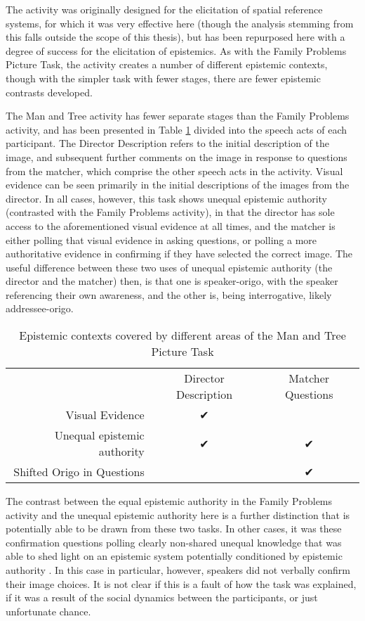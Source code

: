The activity was originally designed for the elicitation of spatial reference systems, for which it was very effective here (though the analysis stemming from this falls outside the scope of this thesis), but has been repurposed here with a degree of success for the elicitation of epistemics. As with the Family Problems Picture Task, the activity creates a number of different epistemic contexts, though with the simpler task with fewer stages, there are fewer epistemic contrasts developed. 

The Man and Tree activity has fewer separate stages than the Family Problems activity, and has been presented in Table \ref{t:Methods:ManTreeEvidentials} divided into the speech acts of each participant. The Director Description refers to the initial description of the image, and subsequent further comments on the image in response to questions from the matcher, which comprise the other speech acts in the activity. Visual evidence can be seen primarily in the initial descriptions of the images from the director. In all cases, however, this task shows unequal epistemic authority (contrasted with the Family Problems activity), in that the director has sole access to the aforementioned visual evidence at all times, and the matcher is either polling that visual evidence in asking questions, or polling a more authoritative evidence in confirming if they have selected the correct image. The useful difference between these two uses of unequal epistemic authority (the director and the matcher) then, is that one is speaker-origo, with the speaker referencing their own awareness, and the other is, being interrogative, likely addressee-origo.

\begin{table}
  \begin{tabular}{r|c|c}
   & Director Description & Matcher Questions \\
  Visual Evidence & ✔ & \\
  Unequal epistemic authority & ✔ & ✔ \\
  Shifted Origo in Questions & & ✔
  \end{tabular}
  \caption{Epistemic contexts covered by different areas of the Man and Tree Picture Task}\label{t:Methods:ManTreeEvidentials}
  \end{table}

The contrast between the equal epistemic authority in the Family Problems activity and the unequal epistemic authority here is a further distinction that is potentially able to be drawn from these two tasks. In other cases, it was these confirmation questions polling clearly non-shared unequal knowledge that was able to shed light on an epistemic system potentially conditioned by epistemic authority \cite{Bodnaruk2023}. In this case in particular, however, speakers did not verbally confirm their image choices. It is not clear if this is a fault of how the task was explained, if it was a result of the social dynamics between the participants, or just unfortunate chance.

